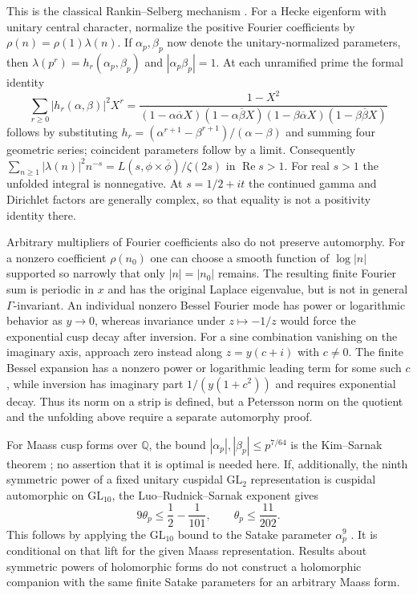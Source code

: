 This is the classical Rankin--Selberg mechanism
\cite[p.~415, formula~(3)]{syn-arith:Zagier}.
For a Hecke eigenform with unitary central character, normalize the positive
Fourier coefficients by $\rho(n)=\rho(1)\lambda(n)$.
If $\alpha_p,\beta_p$ now denote the unitary-normalized parameters, then
$\lambda(p^r)=h_r(\alpha_p,\beta_p)$ and $|\alpha_p\beta_p|=1$.
At each unramified prime the formal identity
\[
 \sum_{r\geq0}|h_r(\alpha,\beta)|^2X^r
 =\frac{1-X^2}
 {(1-\alpha\overline\alpha X)(1-\alpha\overline\beta X)
  (1-\beta\overline\alpha X)(1-\beta\overline\beta X)}
\]
follows by substituting
$h_r=(\alpha^{r+1}-\beta^{r+1})/(\alpha-\beta)$ and summing four geometric
series; coincident parameters follow by a limit.
Consequently
$\sum_{n\geq1}|\lambda(n)|^2n^{-s}
=L(s,\phi\times\overline\phi)/\zeta(2s)$ in $\operatorname{Re}s>1$.
For real $s>1$ the unfolded integral is nonnegative.
At $s=1/2+it$ the continued gamma and Dirichlet factors are generally
complex, so that equality is not a positivity identity there.

Arbitrary multipliers of Fourier coefficients also do not preserve
automorphy.  For a nonzero coefficient $\rho(n_0)$ one can choose a smooth
function of $\log|n|$ supported so narrowly that only $|n|=|n_0|$ remains.
The resulting finite Fourier sum is periodic in $x$ and has the original
Laplace eigenvalue, but is not in general $\Gamma$-invariant.
An individual nonzero Bessel Fourier mode has power or logarithmic
behavior as $y\to0$, whereas invariance under $z\mapsto-1/z$ would force
the exponential cusp decay after inversion.
For a sine combination vanishing on the imaginary axis, approach zero
instead along $z=y(c+i)$ with $c\ne0$.  The finite Bessel expansion has a
nonzero power or logarithmic leading term for some such $c$, while inversion
has imaginary part $1/(y(1+c^2))$ and requires exponential decay.
Thus its norm on a strip is defined, but a Petersson norm on the quotient
and the unfolding above require a separate automorphy proof.

For Maass cusp forms over $\mathbb Q$, the bound
$|\alpha_p|,|\beta_p|\leq p^{7/64}$ is the Kim--Sarnak theorem
\cite[Appendix~2]{syn-arith:KimSarnak}; no assertion that it is optimal is
needed here.
If, additionally, the ninth symmetric power of a fixed unitary cuspidal
$\mathrm{GL}_2$ representation is cuspidal automorphic on
$\mathrm{GL}_{10}$, the Luo--Rudnick--Sarnak exponent gives
\[
 9\theta_p\leq\frac12-\frac1{101},\qquad
 \theta_p\leq\frac{11}{202}.
\]
This follows by applying the $\mathrm{GL}_{10}$ bound to the Satake
parameter $\alpha_p^9$ \cite{syn-arith:LRS}.
It is conditional on that lift for the given Maass representation.
Results about symmetric powers of holomorphic forms do not construct a
holomorphic companion with the same finite Satake parameters for an
arbitrary Maass form.


